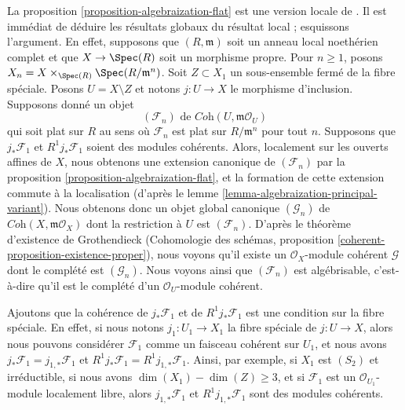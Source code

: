 \begin{remark}
\label{remark-interesting-case-quater}
La proposition \ref{proposition-algebraization-flat} est une version locale
de \cite[Theorem 2.10 (i)]{Baranovsky}. Il est immédiat de déduire
les résultats globaux du résultat local ; esquissons l'argument.
En effet, supposons que $(R, \mathfrak m)$
soit un anneau local noethérien complet et que $X \to \Spec(R)$ soit un morphisme propre.
Pour $n \geq 1$, posons $X_n = X \times_{\Spec(R)} \Spec(R/\mathfrak m^n)$.
Soit $Z \subset X_1$ un sous-ensemble fermé de la fibre spéciale.
Posons $U = X \setminus Z$ et notons $j : U \to X$ le morphisme d'inclusion.
Supposons donné un objet
$$
(\mathcal{F}_n) \text{ de } \textit{Coh}(U, \mathfrak m\mathcal{O}_U)
$$
qui soit plat sur $R$ au sens où $\mathcal{F}_n$ est plat sur
$R/\mathfrak m^n$ pour tout $n$.
Supposons que $j_*\mathcal{F}_1$ et $R^1j_*\mathcal{F}_1$ soient des modules
cohérents. Alors, localement sur les ouverts affines de $X$, nous obtenons une extension canonique
de $(\mathcal{F}_n)$ par la
proposition \ref{proposition-algebraization-flat},
et la formation de cette extension commute à la localisation
(d'après le lemme \ref{lemma-algebraization-principal-variant}).
Nous obtenons donc un objet global canonique $(\mathcal{G}_n)$ de
$\textit{Coh}(X, \mathfrak m\mathcal{O}_X)$
dont la restriction à $U$ est $(\mathcal{F}_n)$.
D'après le théorème d'existence de Grothendieck
(Cohomologie des schémas, proposition
\ref{coherent-proposition-existence-proper}),
nous voyons qu'il existe un $\mathcal{O}_X$-module cohérent
$\mathcal{G}$ dont le complété est $(\mathcal{G}_n)$.
Nous voyons ainsi que $(\mathcal{F}_n)$ est algébrisable, c'est-à-dire
qu'il est le complété d'un $\mathcal{O}_U$-module cohérent.

\medskip\noindent
Ajoutons que la cohérence de $j_*\mathcal{F}_1$ et de $R^1j_*\mathcal{F}_1$
est une condition sur la fibre spéciale. En effet, si nous notons
$j_1 : U_1 \to X_1$ la fibre spéciale de $j : U \to X$, alors nous pouvons
considérer $\mathcal{F}_1$ comme un faisceau cohérent sur $U_1$, et nous avons
$j_*\mathcal{F}_1 = j_{1, *}\mathcal{F}_1$ et
$R^1j_*\mathcal{F}_1 = R^1j_{1, *}\mathcal{F}_1$.
Ainsi, par exemple, si $X_1$ est $(S_2)$ et irréductible, si nous avons
$\dim(X_1) - \dim(Z) \geq 3$, et si $\mathcal{F}_1$ est un
$\mathcal{O}_{U_1}$-module localement libre, alors $j_{1, *}\mathcal{F}_1$ et
$R^1j_{1, *}\mathcal{F}_1$ sont des modules cohérents.
\end{remark}








